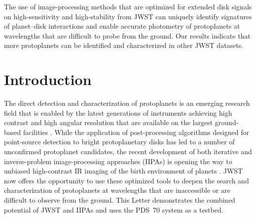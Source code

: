 \documentclass[longauth]{aa}
\newcommand{\vc}[1]{#1}
\begin{document}
   {The use of image-processing methods that are optimized for extended disk signals on high-sensitivity and high-stability from %
   \vc{JWST}
   can uniquely identify signatures of planet--disk interactions and enable accurate photometry of protoplanets at wavelengths that are difficult to probe from the ground. Our results indicate that more protoplanets can be identified and characterized in other JWST datasets.}
   
    \maketitle
    

\section{Introduction}
    The direct detection and characterization of protoplanets is an emerging research field that is enabled by the latest generations of instruments \vc{achieving} high contrast and high angular resolution that are available on the largest ground-based facilities \citep[e.g.,][]{Keppler2018, Hammond2023}. %
    While the application of post-processing algorithms designed for point-source detection to bright protoplanetary disks has led to a number of unconfirmed protoplanet candidates, the recent development of both iterative and inverse-problem image-processing approaches (IIPAs) is opening the way to unbiased high-contrast IR imaging of the birth environment %
    of planets \citep[e.g.,][]{Pairet2021,Flasseur2021,
    Juillard2023}. %
    \vc{JWST} now offers the opportunity to use these optimized tools to deepen the search and characterization of protoplanets at wavelengths that are inaccessible or are difficult to observe from the ground. This Letter demonstrates the combined potential of JWST and IIPAs and %
    uses %
    the PDS~70 %
    system as a testbed.
\end{document}
